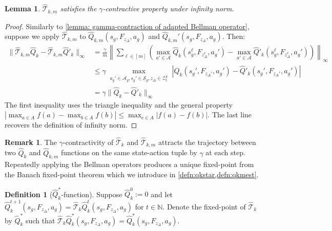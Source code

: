 \documentclass{article}
\theoremstyle{plain}
\newtheorem{lemma}[theorem]{Lemma}
\theoremstyle{definition}
\newtheorem{definition}[theorem]{Definition}
\newtheorem{remark}[theorem]{Remark}
\def\N{\mathbb{N}}
\begin{document}
\begin{lemma}
$\hat{\mathcal{T}}_{k,m}$ satisfies the $\gamma$-contractive property under infinity norm.\label{lemma: gamma-contraction of empirical adapted Bellman operator}
\end{lemma}
\begin{proof}
Similarly to \cref{lemma: gamma-contraction of adapted Bellman operator}, suppose we apply $\hat{\mathcal{T}}_{k,m}$ to $\hat{Q}_{k,m}(s_g,F_{z_\Delta},a_g)$ and $\hat{Q}_{k,m}'(s_g,F_{z_\Delta},a_g)$. Then:
\begin{align*}    \|\hat{\mathcal{T}}_{k,m}\hat{Q}_k - \hat{\mathcal{T}}_{k,m}\hat{Q}'_k\|_\infty &= \frac{\gamma}{m}\left\|\sum_{\ell\in [m]} \left(\max_{a'\in\mathcal{A}} \hat{Q}_k(s_g^\ell,F_{z_\Delta^\ell},a_g') -  \max_{a'\in\mathcal{A}} \hat{Q}'_k(s_g^\ell,F_{z_\Delta^\ell},a_g')\right)\right\|_\infty \\
    &\leq \gamma \max_{\substack{a_g'\in\mathcal{A}_g, s_g' \in\mathcal{S}_g, z_\Delta\in\mathcal{Z}_l^k}}|\hat{Q}_k(s_g', F_{z_\Delta'}, a_g') - \hat{Q}'_k(s_g', F_{z_\Delta'}, a_g')| \\
    &= \gamma \|\hat{Q}_k - \hat{Q}'_k\|_\infty
\end{align*} 
 The first inequality uses the triangle inequality and the general property $|\max_{a\in A}f(a) - \max_{b\in A}f(b)| \leq \max_{c\in A}|f(a) - f(b)|$. The last line recovers the definition of infinity norm.\qedhere
\end{proof}

\begin{remark}\label{remark: gamma-contractive of ad_T}The $\gamma$-contractivity of $\hat{\mathcal{T}}_k$ and $\hat{\mathcal{T}}_{k,m}$ attracts the trajectory between two $\hat{Q}_k$ and $\hat{Q}_{k,m}$ functions on the same state-action tuple by $\gamma$ at each step. Repeatedly applying the Bellman operators produces a unique fixed-point from the Banach fixed-point theorem which we introduce in \cref{defn:qkstar,defn:qkmest}.\end{remark}

\begin{definition}[$\hat{Q}_k^*$-function]\label{defn:qkstar}Suppose $\hat{Q}_k^0:=0$ and let $\hat{Q}_k^{t+1}(s_g,F_{z_\Delta},a_g) = \hat{\mathcal{T}}_k \hat{Q}_k^t(s_g,F_{z_\Delta},a_g)$
    for $t\in\N$. Denote the fixed-point of $\hat{\mathcal{T}}_k$ by $\hat{Q}^*_k$ such that $\hat{\mathcal{T}}_k \hat{Q}^*_k(s_g,F_{z_\Delta},a_g) = \hat{Q}^*_k(s_g,F_{z_\Delta},a_g)$.
\end{definition}
\end{document}
